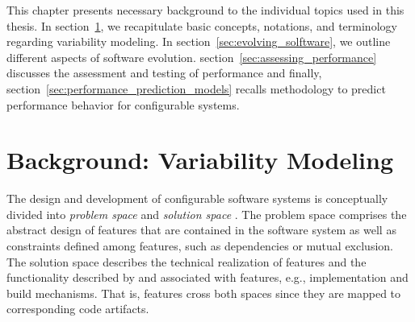 This chapter presents necessary background to the individual topics used in this
thesis. In section~\ref{sec:variability_modeling}, we recapitulate
basic concepts, notations, and terminology regarding variability modeling. In section~\ref{sec:evolving_solftware}, we
outline different aspects of software evolution.
section~\ref{sec:assessing_performance} discusses the assessment and testing of
performance and finally, section~\ref{sec:performance_prediction_models} recalls methodology to predict
performance behavior for configurable systems.

\section{Background: Variability Modeling} \label{sec:variability_modeling}
The design and development of configurable software systems is conceptually
divided into \emph{problem space} and \emph{solution space} \citep{czarnecki_generative_2000}. The problem space
comprises the abstract design of features that are contained in the software
system as well as constraints defined among features, such as dependencies or mutual exclusion.
The solution space describes the technical realization of features and the
functionality described by and associated with features, e.g., implementation
and build mechanisms. That is, features cross both spaces since they are mapped
to corresponding code artifacts.

